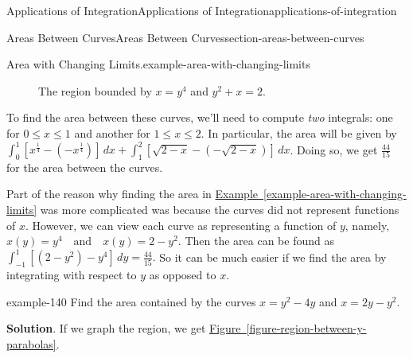 \documentclass[oneside,10pt,]{book}
\numberwithin{equation}{section}
\begin{document}
\begin{chapterptx}{Applications of Integration}{}{Applications of Integration}{}{}{applications-of-integration}
\begin{sectionptx}{Areas Between Curves}{}{Areas Between Curves}{}{}{section-areas-between-curves}
\begin{example}{Area with Changing Limits.}{example-area-with-changing-limits}
\begin{figure}
{
}
\caption{The region bounded by \(x = y^{4}\) and \(y^{2} + x = 2\).\label{figure-graph-between-x-curves}}
\end{figure}
\hypertarget{p-622}{}%
To find the area between these curves, we'll need to compute \emph{two} integrals: one for \(0\leq x\leq 1\) and another for \(1\leq x\leq 2\). In particular, the area will be given by \(\int_{0}^{1}[x^{\frac{1}{4}} - (-x^{\frac{1}{4}})]\,dx + \int_{1}^{2}[\sqrt{2 - x} - (-\sqrt{2 - x})]\,dx\). Doing so, we get \(\frac{44}{15}\) for the area between the curves.%
\end{example}
\hypertarget{p-623}{}%
Part of the reason why finding the area in \hyperref[example-area-with-changing-limits]{Example~\ref{example-area-with-changing-limits}} was more complicated was because the curves did not represent functions of \(x\). However, we can view each curve as representing a function of \(y\), namely, \(x(y) = y^{4} \quad\text{and}\quad x(y) = 2 - y^{2}.\) Then the area can be found as \(\int_{-1}^{1}[(2 - y^{2}) - y^{4}]\,dy = \frac{44}{15}.\) So it can be much easier if we find the area by integrating with respect to \(y\) as opposed to \(x\).%
\begin{example}{}{example-140}%
\hypertarget{p-624}{}%
Find the area contained by the curves \(x = y^{2} - 4y\) and \(x = 2y - y^{2}\).%
\par\smallskip%
\noindent\textbf{Solution}.\hypertarget{solution-136}{}\quad%
\hypertarget{p-625}{}%
If we graph the region, we get \hyperref[figure-region-between-y-parabolas]{Figure~\ref{figure-region-between-y-parabolas}}.%
\begin{figure}
\centering
{
}
\end{figure}
\end{example}
\end{sectionptx}
\end{chapterptx}
\end{document}
